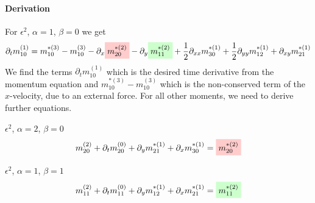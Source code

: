 \documentclass{article}
\begin{document}
\paragraph{Derivation}
\label{par:Derivation of momentum equation}

For $\epsilon^2$, $\alpha=1$, $\beta=0$ we get
\begin{equation}
  \begin{aligned}
     \partial_t m_{10}^{(1)} =
    m_{10}^{*(3)} - m_{10}^{(3)}
    - \partial_x \highlight{m_{20}^{*(2)}} -
    \partial_y \highlight[green]{m_{11}^{*(2)}} + \frac{1}{2}\partial_{xx} m_{30}^{*(1)} + \frac{1}{2} \partial_{yy} m_{12}^{*(1)} + \partial_{xy} m_{21}^{*(1)}
  \end{aligned}
\end{equation}
We find the terms $\partial_t m_{10}^{(1)} $ which is the desired time derivative from the momentum equation and $ m_{10}^{*(3)} - m_{10}^{(3)}$ which is the non-conserved term of the $x$-velocity, due to an external force. For all other moments, we need to derive further equations.

$\epsilon^2$, $\alpha=2$, $\beta=0$
\begin{equation}
  m_{20}^{(2)} + \partial_t m_{20}^{(0)} + \partial_y m_{21}^{*(1)} + \partial_x m_{30}^{*(1)} = \highlight{m_{20}^{*(2)}}
\end{equation}

$\epsilon^2$, $\alpha=1$, $\beta=1$
\begin{equation}
  m_{11}^{(2)} + \partial_t m_{11}^{(0)} + \partial_y m_{12}^{*(1)} + \partial_x m_{21}^{*(1)} = \highlight[green]{m_{11}^{*(2)}}
 \end{equation}
\end{document}
